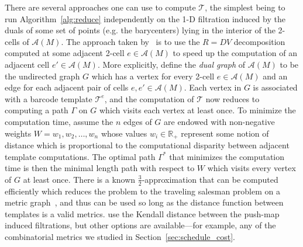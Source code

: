 \documentclass[sn-mathphys]{sn-jnl}
\begin{document}
There are several approaches one can use to compute $\mathcal{T}$, the simplest being to run Algorithm~\ref{alg:reduce} independently on the 1-D filtration induced by the duals of some set of points (e.g. the barycenters) lying in the interior of the 2-cells of $\mathcal{A}(M)$.  
The approach taken by~\cite{lesnick2015interactive} is to use the $R = DV$ decomposition computed at some adjacent 2-cell $e \in \mathcal{A}(M)$ to speed up the computation of an adjacent cell $e' \in \mathcal{A}(M)$. More explicitly, define the \emph{dual graph} of $\mathcal{A}(M)$ to be the undirected graph $G$ which has a vertex for every 2-cell $e \in \mathcal{A}(M)$ and an edge for each adjacent pair of cells $e, e' \in \mathcal{A}(M)$.
Each vertex in $G$ is associated with a barcode template $\mathcal{T}^e$, and the computation of $\mathcal{T}$ now reduces to computing a path $\Gamma$ on $G$ which visits each vertex at least once. To minimize the computation time, assume the $n$ edges of $G$ are endowed with non-negative weights $W = w_1, w_2, \dots, w_n$ whose values $w_i \in \mathbb{R}_{+}$ represent some notion of distance which is proportional to the computational disparity between adjacent template computations. The optimal path $\Gamma^\ast$ that minimizes the computation time is then the minimal length path with respect to $W$ which visits every vertex of $G$ at least once. There is a known $\frac{3}{2}$-approximation that can be computed efficiently which reduces the problem to the traveling salesman problem on a metric graph~\cite{christofides2022worst}, and thus can be used so long as the distance function between templates is a valid metrics. \cite{lesnick2012multidimensional} use the Kendall distance between the push-map induced filtrations, but other options are available---for example, any of the combinatorial metrics we studied in Section~\ref{sec:schedule_cost}. 

\end{document}
